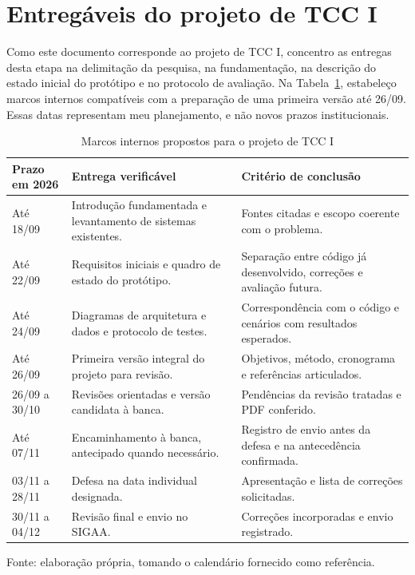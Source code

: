 \section{Entregáveis do projeto de TCC I}

Como este documento corresponde ao projeto de TCC I, concentro as entregas desta etapa na delimitação da pesquisa, na fundamentação, na descrição do estado inicial do protótipo e no protocolo de avaliação. Na Tabela~\ref{tab:cronograma}, estabeleço marcos internos compatíveis com a preparação de uma primeira versão até 26/09. Essas datas representam meu planejamento, e não novos prazos institucionais.

\begin{table}[htb]
\centering
\caption{Marcos internos propostos para o projeto de TCC I}
\label{tab:cronograma}
\small
\begin{tabular}{p{}p{}p{}}
\hline
\textbf{Prazo em 2026} & \textbf{Entrega verificável} & \textbf{Critério de conclusão} \\ \hline
Até 18/09 & Introdução fundamentada e levantamento de sistemas existentes. & Fontes citadas e escopo coerente com o problema. \\ \hline
Até 22/09 & Requisitos iniciais e quadro de estado do protótipo. & Separação entre código já desenvolvido, correções e avaliação futura. \\ \hline
Até 24/09 & Diagramas de arquitetura e dados e protocolo de testes. & Correspondência com o código e cenários com resultados esperados. \\ \hline
Até 26/09 & Primeira versão integral do projeto para revisão. & Objetivos, método, cronograma e referências articulados. \\ \hline
26/09 a 30/10 & Revisões orientadas e versão candidata à banca. & Pendências da revisão tratadas e PDF conferido. \\ \hline
Até 07/11 & Encaminhamento à banca, antecipado quando necessário. & Registro de envio antes da defesa e na antecedência confirmada. \\ \hline
03/11 a 28/11 & Defesa na data individual designada. & Apresentação e lista de correções solicitadas. \\ \hline
30/11 a 04/12 & Revisão final e envio no SIGAA. & Correções incorporadas e envio registrado. \\ \hline
\end{tabular}
\par\smallskip
{\footnotesize Fonte: elaboração própria, tomando o calendário fornecido como referência.}
\end{table}

